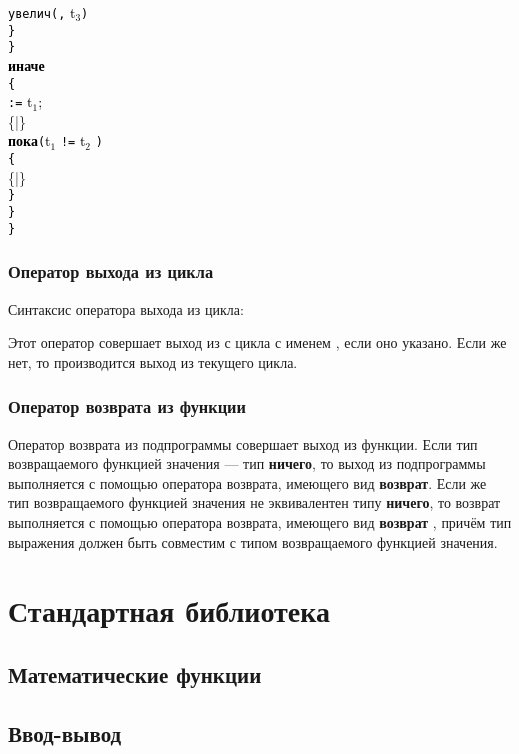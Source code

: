 \documentclass[10pt]{report}
\begin{document}
{{\phantom{конецмоимс}\textcolor{Black}{\texttt{увелич}}\textcolor{Black}{\texttt{(}}\textcolor{Black}{\texttt{,}} \textcolor{Black}{t$_3$}\textcolor{Black}{\texttt{)}}\\
\phantom{конец}\textcolor{Black}{\texttt{\}}}\\
\textcolor{Black}{\texttt{\}}}\\
\textcolor{Black}{\textbf{иначе}}\\
\textcolor{Black}{\texttt{\{}}\\
\phantom{конец} \textcolor{Black}{\texttt{:=}} \textcolor{Black}{t$_1$}\textcolor{Black}{;}\\
\phantom{конец}\{|\}\\
\phantom{конец}\textcolor{Black}{\textbf{пока}}\textcolor{Black}{\texttt{(}}\textcolor{Black}{t$_1$} \textcolor{Black}{\texttt{!=}} \textcolor{Black}{t$_2$}%
\textcolor{Black}{\texttt{)}}\\
\phantom{конец}\textcolor{Black}{\texttt{\{}}\\
\phantom{конецмоимс}\{|\}\\
\phantom{конец}\textcolor{Black}{\texttt{\}}}\\
\textcolor{Black}{\texttt{\}}}\\
\textcolor{Black}{\texttt{\}}}
}}

    \subsection{Оператор выхода из цикла}

Синтаксис оператора выхода из цикла:
\begin{center}
\textcolor{Green}{}
\end{center}
Этот оператор совершает выход из с цикла с именем \textcolor{Green}{}, если оно указано. Если же нет, то производится выход из текущего цикла.

    \subsection{Оператор возврата из функции}
Оператор возврата из подпрограммы совершает выход из функции. Если тип возвращаемого функцией значения --- тип \textbf{ничего}, то выход из подпрограммы выполняется
с помощью оператора возврата, имеющего вид \textbf{возврат}. Если же тип возвращаемого функцией значения не эквивалентен типу \textbf{ничего}, то возврат выполняется
с помощью оператора возврата, имеющего вид \textbf{возврат} \textcolor{Green}{}, причём тип выражения должен быть совместим с типом
возвращаемого функцией значения.
         
\chapter{Стандартная библиотека}
    \section{Математические функции}
    \section{Ввод-вывод}
\end{document}
